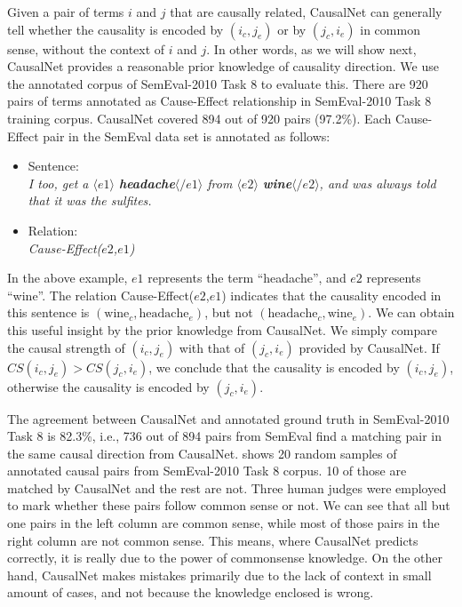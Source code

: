 Given a pair of terms $i$ and $j$ that are causally related,
CausalNet can generally tell whether the causality is encoded by $(i_c,j_e)$
or by $(j_c,i_e)$ in common sense, without the context of
$i$ and $j$. In other words, as we will show next, CausalNet
provides a reasonable prior knowledge of causality direction.
We use the annotated corpus of SemEval-2010 Task 8 to evaluate this.
There are 920 pairs of terms annotated as Cause-Effect relationship in
SemEval-2010 Task 8 training corpus. CausalNet covered 894 out of
920 pairs (97.2\%).
Each Cause-Effect pair in the SemEval data set is annotated as follows:
\begin{itemize}
  \item[] Sentence:\\
  {\em I too, get a $\langle e1\rangle$ \textbf{headache}$\langle/e1\rangle$
  from $\langle e2\rangle$ \textbf{wine}$\langle/e2\rangle$, and was always told that it was the sulfites.}
  \item[] Relation: \\ \emph{Cause-Effect($e2$,$e1$)}
\end{itemize}
In the above example, $e1$ represents the term ``headache'', and
$e2$ represents ``wine''. The relation Cause-Effect($e2$,$e1$)
indicates that the causality encoded in this sentence is
$(\text{wine}_c,\text{headache}_e)$,
but not
$(\text{headache}_c,\text{wine}_e)$.
We can obtain this useful
insight by the prior knowledge from CausalNet.
We simply compare the causal strength of
$(i_c,j_e)$ with that of $(j_c,i_e)$ provided by
CausalNet. If $CS(i_c,j_e) > CS(j_c,i_e)$, we
conclude that the causality is encoded by $(i_c,j_e)$,
otherwise the causality is encoded by $(j_c,i_e)$.

The agreement between CausalNet and annotated ground truth in SemEval-2010
Task 8 is 82.3\%, i.e., 736 out of 894 pairs from SemEval find
a matching pair in the same causal direction from CausalNet.
 shows 20 random samples of annotated causal pairs
from SemEval-2010 Task 8 corpus. 10 of those are matched by
CausalNet and the rest are not. Three human judges were employed to
mark whether these pairs follow common sense or not. 
We can see that all but one pairs in the left column are common sense,
while most of those pairs in the right column are not common sense.
This means, where CausalNet predicts correctly, it is really due to the power
of commonsense knowledge. On the other hand, CausalNet makes mistakes primarily
due to the lack of context in small amount of cases, and not because the
knowledge enclosed is wrong.
